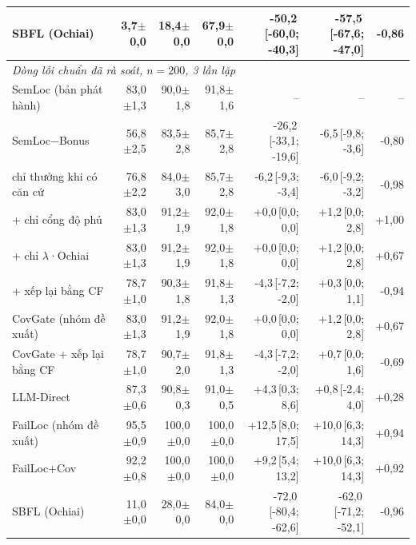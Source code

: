 \begin{tabular}{lrrrrrr}
SBFL (Ochiai) & 3,7{\scriptsize$\pm$0,0} & 18,4{\scriptsize$\pm$0,0} & 67,9{\scriptsize$\pm$0,0} & -50,2{\scriptsize\,[-60,0; -40,3]} & -57,5{\scriptsize\,[-67,6; -47,0]} & -0,86 \\
\midrule
\multicolumn{7}{l}{\emph{Dòng lỗi chuẩn đã rà soát, $n=200$, 3 lần lặp}} \\
SemLoc (bản phát hành) & 83,0{\scriptsize$\pm$1,3} & 90,0{\scriptsize$\pm$1,8} & 91,8{\scriptsize$\pm$1,6} & -- & -- & -- \\
SemLoc−Bonus & 56,8{\scriptsize$\pm$2,5} & 83,5{\scriptsize$\pm$2,8} & 85,7{\scriptsize$\pm$2,8} & -26,2{\scriptsize\,[-33,1; -19,6]} & -6,5{\scriptsize\,[-9,8; -3,6]} & -0,80 \\
\quad chỉ thưởng khi có căn cứ & 76,8{\scriptsize$\pm$2,2} & 84,0{\scriptsize$\pm$3,0} & 85,7{\scriptsize$\pm$2,8} & -6,2{\scriptsize\,[-9,3; -3,4]} & -6,0{\scriptsize\,[-9,2; -3,2]} & -0,98 \\
\quad + chỉ cổng độ phủ & 83,0{\scriptsize$\pm$1,3} & 91,2{\scriptsize$\pm$1,9} & 92,0{\scriptsize$\pm$1,8} & +0,0{\scriptsize\,[0,0; 0,0]} & +1,2{\scriptsize\,[0,0; 2,8]} & +1,00 \\
\quad + chỉ $\lambda$·Ochiai & 83,0{\scriptsize$\pm$1,3} & 91,2{\scriptsize$\pm$1,9} & 92,0{\scriptsize$\pm$1,8} & +0,0{\scriptsize\,[0,0; 0,0]} & +1,2{\scriptsize\,[0,0; 2,8]} & +0,67 \\
\quad + xếp lại bằng CF & 78,7{\scriptsize$\pm$1,0} & 90,3{\scriptsize$\pm$1,8} & 91,8{\scriptsize$\pm$1,3} & -4,3{\scriptsize\,[-7,2; -2,0]} & +0,3{\scriptsize\,[0,0; 1,1]} & -0,94 \\
CovGate (nhóm đề xuất) & 83,0{\scriptsize$\pm$1,3} & 91,2{\scriptsize$\pm$1,9} & 92,0{\scriptsize$\pm$1,8} & +0,0{\scriptsize\,[0,0; 0,0]} & +1,2{\scriptsize\,[0,0; 2,8]} & +0,67 \\
CovGate + xếp lại bằng CF & 78,7{\scriptsize$\pm$1,0} & 90,7{\scriptsize$\pm$2,0} & 91,8{\scriptsize$\pm$1,3} & -4,3{\scriptsize\,[-7,2; -2,0]} & +0,7{\scriptsize\,[0,0; 1,6]} & -0,69 \\
LLM-Direct & 87,3{\scriptsize$\pm$0,6} & 90,8{\scriptsize$\pm$0,3} & 91,0{\scriptsize$\pm$0,5} & +4,3{\scriptsize\,[0,3; 8,6]} & +0,8{\scriptsize\,[-2,4; 4,0]} & +0,28 \\
FailLoc (nhóm đề xuất) & 95,5{\scriptsize$\pm$0,9} & 100,0{\scriptsize$\pm$0,0} & 100,0{\scriptsize$\pm$0,0} & +12,5{\scriptsize\,[8,0; 17,5]} & +10,0{\scriptsize\,[6,3; 14,3]} & +0,94 \\
FailLoc+Cov & 92,2{\scriptsize$\pm$0,8} & 100,0{\scriptsize$\pm$0,0} & 100,0{\scriptsize$\pm$0,0} & +9,2{\scriptsize\,[5,4; 13,2]} & +10,0{\scriptsize\,[6,3; 14,3]} & +0,92 \\
SBFL (Ochiai) & 11,0{\scriptsize$\pm$0,0} & 28,0{\scriptsize$\pm$0,0} & 84,0{\scriptsize$\pm$0,0} & -72,0{\scriptsize\,[-80,4; -62,6]} & -62,0{\scriptsize\,[-71,2; -52,1]} & -0,96 \\
\bottomrule
\end{tabular}

